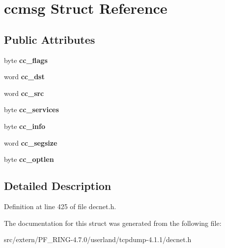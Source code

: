 \hypertarget{structccmsg}{
\section{ccmsg Struct Reference}
\label{structccmsg}
}
\subsection*{Public Attributes}
\begin{DoxyCompactItemize}
\item 
\hypertarget{structccmsg_a24a2ee349f33b806beda913e946af910}{
byte {\bfseries cc\_\-flags}}
\label{structccmsg_a24a2ee349f33b806beda913e946af910}

\item 
\hypertarget{structccmsg_aab1cc4f816b850a77efcd740c06d4e34}{
word {\bfseries cc\_\-dst}}
\label{structccmsg_aab1cc4f816b850a77efcd740c06d4e34}

\item 
\hypertarget{structccmsg_a1dc0c8cd1769d697821fac56daab2131}{
word {\bfseries cc\_\-src}}
\label{structccmsg_a1dc0c8cd1769d697821fac56daab2131}

\item 
\hypertarget{structccmsg_a54c5d60c2f8f1197af3503e956099970}{
byte {\bfseries cc\_\-services}}
\label{structccmsg_a54c5d60c2f8f1197af3503e956099970}

\item 
\hypertarget{structccmsg_a89c861af1714657e26fc2f0590401da1}{
byte {\bfseries cc\_\-info}}
\label{structccmsg_a89c861af1714657e26fc2f0590401da1}

\item 
\hypertarget{structccmsg_a9f8da64be6739fd05c324ff93fe27307}{
word {\bfseries cc\_\-segsize}}
\label{structccmsg_a9f8da64be6739fd05c324ff93fe27307}

\item 
\hypertarget{structccmsg_af635d32f4be391d20b16909fac29ee4b}{
byte {\bfseries cc\_\-optlen}}
\label{structccmsg_af635d32f4be391d20b16909fac29ee4b}

\end{DoxyCompactItemize}


\subsection{Detailed Description}


Definition at line 425 of file decnet.h.



The documentation for this struct was generated from the following file:\begin{DoxyCompactItemize}
\item 
src/extern/PF\_\-RING-\/4.7.0/userland/tcpdump-\/4.1.1/decnet.h\end{DoxyCompactItemize}
